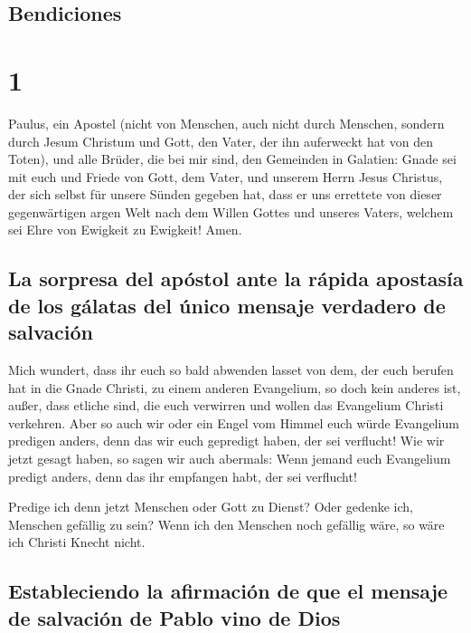 \hypertarget{bendiciones}{%
\subsection{Bendiciones}\label{bendiciones}}

\hypertarget{section}{%
\section{1}\label{section}}

 Paulus, ein Apostel (nicht von Menschen, auch nicht durch
Menschen, sondern durch Jesum Christum und Gott, den Vater, der ihn
auferweckt hat von den Toten),  und alle Brüder, die bei
mir sind, den Gemeinden in Galatien:  Gnade sei mit euch
und Friede von Gott, dem Vater, und unserem Herrn Jesus Christus,
 der sich selbst für unsere Sünden gegeben hat, dass er
uns errettete von dieser gegenwärtigen argen Welt nach dem Willen Gottes
und unseres Vaters,  welchem sei Ehre von Ewigkeit zu
Ewigkeit! Amen.

\hypertarget{la-sorpresa-del-apuxf3stol-ante-la-ruxe1pida-apostasuxeda-de-los-guxe1latas-del-uxfanico-mensaje-verdadero-de-salvaciuxf3n}{%
\subsection{La sorpresa del apóstol ante la rápida apostasía de los
gálatas del único mensaje verdadero de
salvación}\label{la-sorpresa-del-apuxf3stol-ante-la-ruxe1pida-apostasuxeda-de-los-guxe1latas-del-uxfanico-mensaje-verdadero-de-salvaciuxf3n}}

 Mich wundert, dass ihr euch so bald abwenden lasset von
dem, der euch berufen hat in die Gnade Christi, zu einem anderen
Evangelium,  so doch kein anderes ist, außer, dass etliche
sind, die euch verwirren und wollen das Evangelium Christi verkehren.
 Aber so auch wir oder ein Engel vom Himmel euch würde
Evangelium predigen anders, denn das wir euch gepredigt haben, der sei
verflucht!  Wie wir jetzt gesagt haben, so sagen wir auch
abermals: Wenn jemand euch Evangelium predigt anders, denn das ihr
empfangen habt, der sei verflucht!

 Predige ich denn jetzt Menschen oder Gott zu Dienst?
Oder gedenke ich, Menschen gefällig zu sein? Wenn ich den Menschen noch
gefällig wäre, so wäre ich Christi Knecht nicht.

\hypertarget{estableciendo-la-afirmaciuxf3n-de-que-el-mensaje-de-salvaciuxf3n-de-pablo-vino-de-dios}{%
\subsection{Estableciendo la afirmación de que el mensaje de salvación
de Pablo vino de
Dios}\label{estableciendo-la-afirmaciuxf3n-de-que-el-mensaje-de-salvaciuxf3n-de-pablo-vino-de-dios}}

